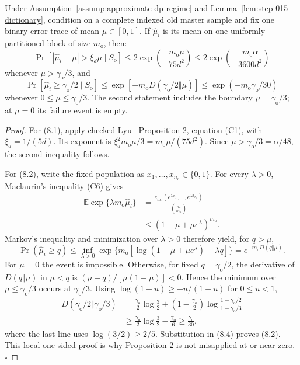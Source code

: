 \begin{lemma}\label{lem:step-015-tails}
Under Assumption~\ref{assump:approximate-dp-regime} and
Lemma~\ref{lem:step-015-dictionary}, condition on a complete indexed old
master sample and fix one binary error trace of mean
\(\mu\in[0,1]\). If \(\widehat\mu_i\) is its mean on one uniformly
partitioned block of size \(m_{\mathrm o}\), then:
\[
\Pr\!\left[
|\widehat\mu_i-\mu|>\xi_d\mu\mid\bar S_{\mathrm o}
\right]
\le2\exp\!\left(-\frac{m_{\mathrm o}\mu}{75d^2}\right)
\le2\exp\!\left(-\frac{m_{\mathrm o}\alpha}{3600d^2}\right)
\tag{8.1}
\]
whenever \(\mu>\gamma_{\mathrm o}/3\), and
\[
\Pr[\widehat\mu_i\ge\gamma_{\mathrm o}/2\mid\bar S_{\mathrm o}]
\le\exp[-m_{\mathrm o}
D(\gamma_{\mathrm o}/2\Vert\mu)]
\le\exp(-m_{\mathrm o}\gamma_{\mathrm o}/30)
\tag{8.2}
\]
whenever \(0\le\mu\le\gamma_{\mathrm o}/3\). The second statement includes
the boundary \(\mu=\gamma_{\mathrm o}/3\); at \(\mu=0\) its failure event
is empty.


\end{lemma}

\begin{proof}
For (8.1), apply checked Lyu~\citep{lyu2025} Proposition 2, equation (C1), with
\(\xi_d=1/(5d)\). Its exponent is
\(\xi_d^2m_{\mathrm o}\mu/3=m_{\mathrm o}\mu/(75d^2)\).
Since
\(\mu>\gamma_{\mathrm o}/3=\alpha/48\), the second inequality follows.

For (8.2), write the fixed population as
\(x_1,\ldots,x_{n_{\mathrm o}}\in\{0,1\}\). For every \(\lambda>0\),
Maclaurin's inequality (C6) gives
\[
\begin{aligned}
\mathbb E\exp\{\lambda m_{\mathrm o}\widehat\mu_i\}
&=\frac{e_{m_{\mathrm o}}
(e^{\lambda x_1},\ldots,e^{\lambda x_{n_{\mathrm o}}})}
{\binom{n_{\mathrm o}}{m_{\mathrm o}}}\\
&\le(1-\mu+\mu e^\lambda)^{m_{\mathrm o}}.
\end{aligned}
\tag{8.3}
\]
Markov's inequality and minimization over \(\lambda>0\) therefore yield,
for \(q>\mu\),
\[
\Pr(\widehat\mu_i\ge q)
\le\inf_{\lambda>0}
\exp\{m_{\mathrm o}[\log(1-\mu+\mu e^\lambda)-\lambda q]\}
=e^{-m_{\mathrm o}D(q\Vert\mu)}.
\tag{8.4}
\]
For \(\mu=0\) the event is impossible. Otherwise, for fixed
\(q=\gamma_{\mathrm o}/2\), the derivative of
\(D(q\Vert\mu)\) in \(\mu<q\) is
\((\mu-q)/[\mu(1-\mu)]<0\). Hence the minimum over
\(\mu\le\gamma_{\mathrm o}/3\) occurs at \(\gamma_{\mathrm o}/3\).
Using \(\log(1-u)\ge-u/(1-u)\) for \(0\le u<1\),
\[
\begin{aligned}
D(\gamma_{\mathrm o}/2\Vert\gamma_{\mathrm o}/3)
&=\frac{\gamma_{\mathrm o}}2\log\frac32
+\left(1-\frac{\gamma_{\mathrm o}}2\right)
\log\frac{1-\gamma_{\mathrm o}/2}{1-\gamma_{\mathrm o}/3}\\
&\ge\frac{\gamma_{\mathrm o}}2\log\frac32
-\frac{\gamma_{\mathrm o}}6
\ge\frac{\gamma_{\mathrm o}}{30},
\end{aligned}
\tag{8.5}
\]
where the last line uses \(\log(3/2)\ge2/5\). Substitution in (8.4)
proves (8.2). This local one-sided proof is why Proposition 2 is not
misapplied at or near zero. \(\square\)


\end{proof}

